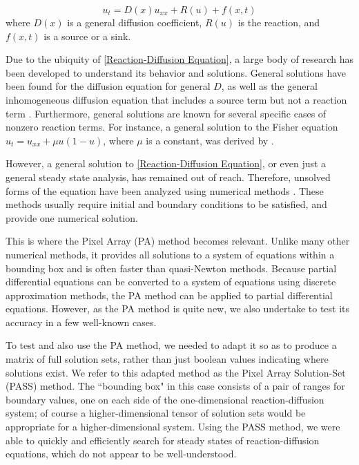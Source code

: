 \documentclass[11pt]{article}
\begin{document}
\begin{equation}
    \label{Reaction-Diffusion Equation}
    u_t = D(x)u_{xx} + R(u) + f(x,t)
\end{equation}
where $D(x)$ is a general diffusion coefficient, $R(u)$ is the reaction, and $f(x,t)$ is a source or a sink.

Due to the ubiquity of \cref{Reaction-Diffusion Equation}, a large body of research has been developed to understand its behavior and solutions. General solutions have been found for the diffusion equation for general $D$, as well as the general inhomogeneous diffusion equation that includes a source term but not a reaction term \citep{Kuttler_lecture}. Furthermore, general solutions are known for several specific cases of nonzero reaction terms. For instance, a general solution to the Fisher equation $u_t = u_{xx} + \mu u(1-u)$, where $\mu$ is a constant, was derived by \citep{AnalyticFisher}.

However, a general solution to \cref{Reaction-Diffusion Equation}, or even just a general steady state analysis, has remained out of reach. Therefore, unsolved forms of the equation have been analyzed using numerical methods \citep{Numerical_RD_1, Numerical_RD_2, Numerical_RD_3}. These methods usually require initial and boundary conditions to be satisfied, and provide one numerical solution.

This is where the Pixel Array (PA) method \citep{Introduction_to_PA} becomes relevant. Unlike many other numerical methods, it provides all solutions to a system of equations within a bounding box and is often faster than quasi-Newton methods. Because partial differential equations can be converted to a system of equations using discrete approximation methods, the PA method can be applied to partial differential equations. However, as the PA method is quite new, we also undertake to test its accuracy in a few well-known cases.

To test and also use the PA method, we needed to adapt it so as to produce a matrix of full solution sets, rather than just boolean values indicating where solutions exist. We refer to this adapted method as the Pixel Array Solution-Set (PASS) method. The ``bounding box" in this case consists of a pair of ranges for boundary values, one on each side of the one-dimensional reaction-diffusion system; of course a higher-dimensional tensor of solution sets would be appropriate for a higher-dimensional system. Using the PASS method, we were able to quickly and efficiently search for steady states of reaction-diffusion equations, which do not appear to be well-understood.
\end{document}
